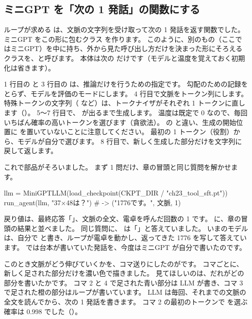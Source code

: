 \subsection{ミニGPT を「次の 1 発話」の関数にする}

ループが求める  は、文脈の文字列を受け取って次の 1 発話を返す関数でした。
ミニGPT をこの形に包むクラス  を作ります。
このように、別のもの（ここではミニGPT）を中に持ち、外から見た呼び出し方だけを決まった形にそろえるクラスを、と呼びます。
本体は次の  だけです（モデルと温度を覚えておく初期化は省きます）。


1 行目の  と 3 行目の  は、推論だけを行うための指定です。
勾配のための記録をとらず、モデルを評価のモードにします。
4 行目で文脈をトークン列にします。
特殊トークンの文字列（ など）は、トークナイザがそれぞれ 1 トークンに直します（）。
5〜7 行目で、 が出るまで生成します。
温度は既定で 0 なので、毎回いちばん確率の高いトークンを選びます（貪欲法）。
の  と違い、生成の開始位置に  を置いていないことに注意してください。
最初の 1 トークン（役割）から、モデルが自分で選びます。
8 行目で、新しく生成した部分だけを文字列に戻して返します。

これで部品がそろいました。
まず 1 問だけ、章の冒頭と同じ質問を解かせます。

\begin{textcode}
llm = MiniGPTLLM(load_checkpoint(CKPT_DIR / "ch23_tool_sft.pt"))
run_agent(llm, "37×48は？")   # -> ("1776です。", 文脈, 1)
\end{textcode}

戻り値は、最終応答「」、文脈の全文、電卓を呼んだ回数の 1 です。
に、章の冒頭の結果と並べました。
同じ質問に、 は「」と答えていました。
いまのモデルは、自分で  と書き、ループが電卓を動かし、返ってきた 1776 を写して答えています。
では台本が書いていた発話を、今度はミニGPT が自分で書いたのです。

このとき文脈がどう伸びていくかを、コマ送りにしたのがです。
コマごとに、新しく足された部分だけを濃い色で描きました。
見てほしいのは、だれがどの部分を書いたかです。
コマ 2 と 4 で足された青い部分は LLM が書き、コマ 3 で足された橙の部分はループが書いています。
LLM は毎回、それまでの文脈の全文を読んでから、次の 1 発話を書きます。
コマ 2 の最初のトークンで  を選ぶ確率は 0.998 でした（）。


